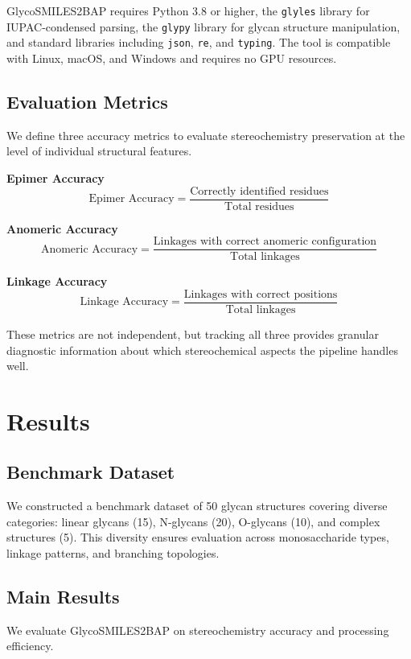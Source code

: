 \documentclass[11pt,a4paper]{article}
\begin{document}
GlycoSMILES2BAP requires Python 3.8 or higher, the \texttt{glyles} library for IUPAC-condensed parsing, the \texttt{glypy} library for glycan structure manipulation, and standard libraries including \texttt{json}, \texttt{re}, and \texttt{typing}. The tool is compatible with Linux, macOS, and Windows and requires no GPU resources.

\subsection{Evaluation Metrics}

We define three accuracy metrics to evaluate stereochemistry preservation at the level of individual structural features.

\textbf{Epimer Accuracy}
\[
\text{Epimer Accuracy} = \frac{\text{Correctly identified residues}}{\text{Total residues}}
\]

\textbf{Anomeric Accuracy}
\[
\text{Anomeric Accuracy} = \frac{\text{Linkages with correct anomeric configuration}}{\text{Total linkages}}
\]

\textbf{Linkage Accuracy}
\[
\text{Linkage Accuracy} = \frac{\text{Linkages with correct positions}}{\text{Total linkages}}
\]

These metrics are not independent, but tracking all three provides granular diagnostic information about which stereochemical aspects the pipeline handles well.

\section{Results}

\subsection{Benchmark Dataset}

We constructed a benchmark dataset of 50 glycan structures covering diverse categories: linear glycans (15), N-glycans (20), O-glycans (10), and complex structures (5). This diversity ensures evaluation across monosaccharide types, linkage patterns, and branching topologies.

\subsection{Main Results}

We evaluate GlycoSMILES2BAP on stereochemistry accuracy and processing efficiency.
\end{document}

